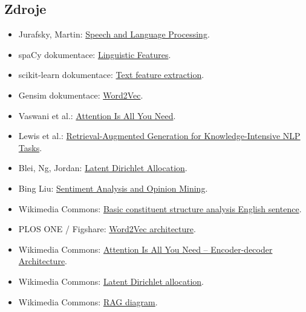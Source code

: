 \subsection{Zdroje}

\begin{itemize}
    \item Jurafsky, Martin:
    \href{https://web.stanford.edu/~jurafsky/slp3/ed3book.pdf}{Speech and Language Processing}.
    \item spaCy dokumentace:
    \href{https://spacy.io/usage/linguistic-features}{Linguistic Features}.
    \item scikit-learn dokumentace:
    \href{https://scikit-learn.org/stable/modules/feature\_extraction.html\#text-feature-extraction}{Text
    feature extraction}.
    \item Gensim dokumentace:
    \href{https://radimrehurek.com/gensim/models/word2vec.html}{Word2Vec}.
    \item Vaswani et al.:
    \href{https://arxiv.org/abs/1706.03762}{Attention Is All You Need}.
    \item Lewis et al.:
    \href{https://arxiv.org/abs/2005.11401}{Retrieval-Augmented Generation for Knowledge-Intensive NLP Tasks}.
    \item Blei, Ng, Jordan:
    \href{https://www.jmlr.org/papers/v3/blei03a.html}{Latent Dirichlet Allocation}.
    \item Bing Liu:
    \href{https://www.cs.uic.edu/~liub/FBS/SentimentAnalysis-and-OpinionMining.pdf}{Sentiment Analysis and
    Opinion Mining}.
    \item Wikimedia Commons:
    \href{https://commons.wikimedia.org/wiki/File:Basic\_constituent\_structure\_analysis\_English\_sentence.svg}{Basic
    constituent structure analysis English sentence}.
    \item PLOS ONE / Figshare:
    \href{https://doi.org/10.1371/journal.pone.0216636.g001}{Word2Vec architecture}.
    \item Wikimedia Commons:
    \href{https://commons.wikimedia.org/wiki/File:Attention\_Is\_All\_You\_Need\_-\_Encoder-decoder\_Architecture.png}{Attention
    Is All You Need -- Encoder-decoder Architecture}.
    \item Wikimedia Commons:
    \href{https://commons.wikimedia.org/wiki/File:Latent\_Dirichlet\_allocation.svg}{Latent Dirichlet allocation}.
    \item Wikimedia Commons:
    \href{https://commons.wikimedia.org/wiki/File:RAG\_diagram.svg}{RAG diagram}.
\end{itemize}

\newpage

